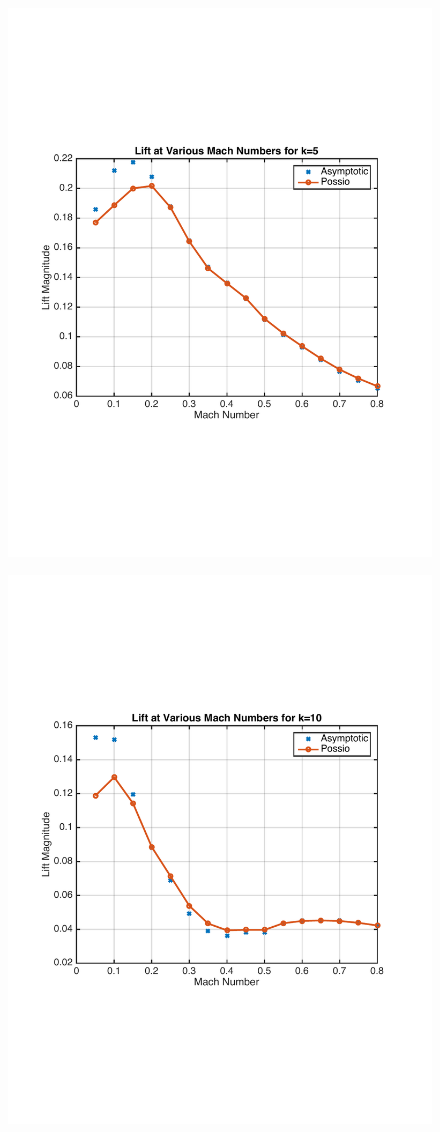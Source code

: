 \documentclass{article}
\begin{document}
\begin{figure}[h]
\includegraphics[width = 4 in, height = 3 in]{k5_MachSweep}
\centering
\end{figure}

\begin{figure}[h]
\includegraphics[width = 4 in, height = 3 in]{k10_MachSweep}
\centering
\end{figure}
\newpage
\end{document}
